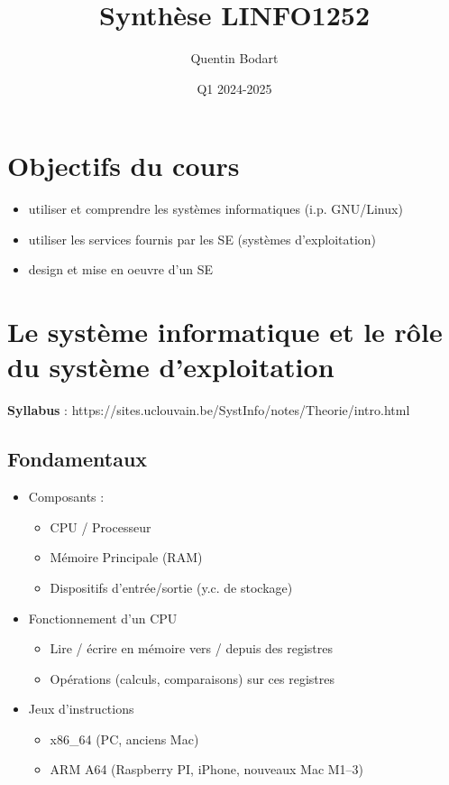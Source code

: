 \documentclass{article}
\title{Synthèse LINFO1252}
\author{Quentin Bodart}
\date{Q1 2024-2025}
\begin{document}
\maketitle
\tableofcontents
\pagebreak

\section*{Objectifs du cours}
    \begin{itemize}
        \item utiliser et comprendre les systèmes informatiques (i.p. GNU/Linux)
        \item utiliser les services fournis par les SE (systèmes d'exploitation)
        \item design et mise en oeuvre d'un SE
    \end{itemize}

\section{Le système informatique et le rôle du système d’exploitation}
\textbf{Syllabus} : https://sites.uclouvain.be/SystInfo/notes/Theorie/intro.html

    \subsection{Fondamentaux}
        \begin{itemize}
            \item Composants :
            \begin{itemize}
                \item CPU / Processeur
                \item Mémoire Principale (RAM)
                \item Dispositifs d’entrée/sortie (y.c. de stockage)
            \end{itemize}
            \item Fonctionnement d'un CPU
            \begin{itemize}
                \item Lire / écrire en mémoire vers / depuis des registres
                \item Opérations (calculs, comparaisons) sur ces registres
            \end{itemize}
            \item Jeux d'instructions
            \begin{itemize}
                \item x86\_64 (PC, anciens Mac)
                \item ARM A64 (Raspberry PI, iPhone, nouveaux Mac M1–3)
            \end{itemize}
        \end{itemize}
    
\end{document}
